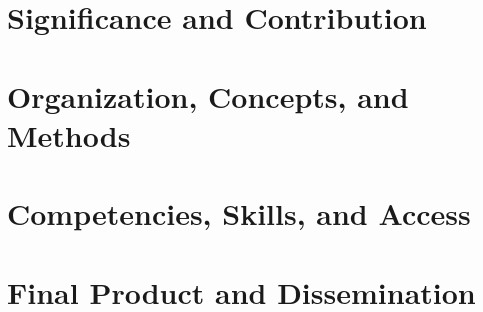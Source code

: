 \section{Significance and Contribution}

\section{Organization, Concepts, and Methods}

\section{Competencies, Skills, and Access}

\section{Final Product and Dissemination}
